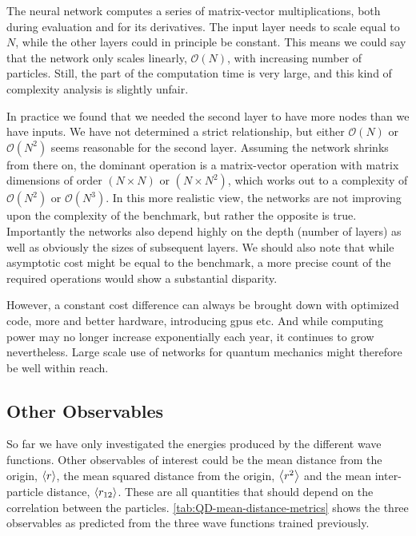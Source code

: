 \documentclass[Thesis.tex]{subfiles}
\begin{document}
The neural network computes a series of matrix-vector multiplications, both during
evaluation and for its derivatives. The input layer needs to scale equal to $N$,
while the other layers could in principle be constant. This means we could say
that the network only scales linearly, $\mathcal{O}(N)$, with increasing number
of particles. Still, the  part of the computation time is very
large, and this kind of complexity analysis is slightly unfair.

In practice we found that we needed the second layer to have more
nodes than we have inputs. We have not determined a strict relationship, but
either $\mathcal{O}(N)$ or $\mathcal{O}(N^2)$ seems reasonable for the second
layer. Assuming the network shrinks from there on, the dominant operation is a
matrix-vector operation with matrix dimensions of order $(N\times N)$ or $(N\times N^2)$,
which works out to a complexity of $\mathcal{O}(N^2)$ or $\mathcal{O}(N^3)$. In
this more realistic view, the networks are not improving upon the complexity of
the benchmark, but rather the opposite is true.\\

Importantly the networks also depend highly on the depth (number of layers) as
well as obviously the sizes of subsequent layers. We should also note that while
asymptotic cost might be equal to the benchmark, a more precise count of the
required operations would show a substantial disparity.

However, a constant cost difference can always be brought down with optimized code, more
and better hardware, introducing \glspl{gpu} etc. And while computing power may no
longer increase exponentially each year, it continues to grow nevertheless.
Large scale use of networks for quantum mechanics might therefore be well
within reach.

\subsection{Other Observables}

So far we have only investigated the energies produced by the different wave
functions. Other observables of interest could be the mean distance from the origin,
$\expval{r}$, the mean squared distance from the origin, $\expval{r^2}$ and the mean
inter-particle distance, $\expval{r_{12}}$. These are all quantities that should
depend on the correlation between the particles.
\cref{tab:QD-mean-distance-metrics} shows the three observables as predicted
from the three wave functions trained previously.
\end{document}
